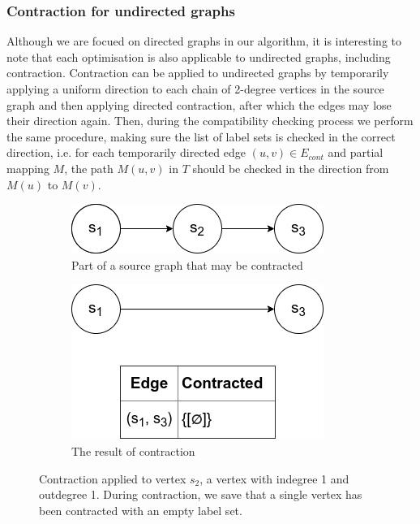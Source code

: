 \subsubsection{Contraction for undirected graphs}
Although we are focued on directed graphs in our algorithm, it is interesting to note that each optimisation is also applicable to undirected graphs, including contraction. Contraction can be applied to undirected graphs by temporarily applying a uniform direction to each chain of 2-degree vertices in the source graph and then applying directed contraction, after which the edges may lose their direction again. Then, during the compatibility checking process we perform the same procedure, making sure the list of label sets is checked in the correct direction, i.e. for each temporarily directed edge $(u, v) \in E_{cont}$ and partial mapping $M$, the path $M(u, v)$ in $T$ should be checked in the direction from $M(u)$ to $M(v)$.



\begin{figure}[ht]
\begin{subfigure}{.5\textwidth}
  \centering
\includegraphics[width=0.8\linewidth]{images/contraction/whatisit1.png}
  \caption{Part of a source graph that may be contracted}
\end{subfigure}
\begin{subfigure}{.5\textwidth}
  \centering
\includegraphics[width=0.8\linewidth]{images/contraction/whatisit2.png}
  \caption{The result of contraction}
\end{subfigure}
\caption{Contraction applied to vertex $s_2$, a vertex with indegree 1 and outdegree 1. During contraction, we save that a single vertex has been contracted with an empty label set.}
\label{fig:contraction-basic}
\end{figure}




